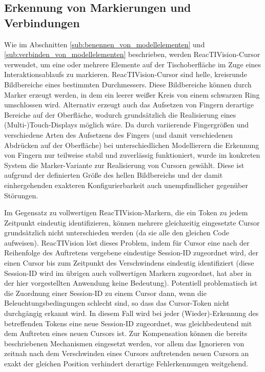 
\subsection{Erkennung von Markierungen und Verbindungen} %
\label{sub:erkennen_von_verbindungen}

Wie im Abschnitten \ref{sub:benennen_von_modellelementen} und \ref{sub:verbinden_von_modellelementen} beschrieben, werden ReacTIVision-Cursor verwendet, um eine oder mehrere Elemente auf der Tischoberfläche im Zuge eines Interaktionsablaufs zu markieren. ReacTIVision-Cursor sind helle, kreisrunde Bildbereiche eines bestimmten Durchmessers. Diese Bildbereiche können durch Marker erzeugt werden, in dem ein leerer weißer Kreis von einem schwarzen Ring umschlossen wird. Alternativ erzeugt auch das Aufsetzen von Fingern derartige Bereiche auf der Oberfläche, wodurch grundsätzlich die Realisierung eines (Multi-)Touch-Displays möglich wäre. Da durch variierende Fingergrößen und verschiedene Arten des Aufsetzens des Fingers (und damit verschiedenen Abdrücken auf der Oberfläche) bei unterschiedlichen Modellierern die Erkennung von Fingern nur teilweise stabil und zuverlässig funktioniert, wurde im konkreten System die Marker-Variante zur Realisierung von Cursorn gewählt. Diese ist aufgrund der definierten Größe des hellen Bildbereichs und der damit einhergehenden exakteren Konfigurierbarkeit auch unempfindlicher gegenüber Störungen.

Im Gegensatz zu vollwertigen ReacTIVision-Markern, die ein Token zu jedem Zeitpunkt eindeutig identifizieren, können mehrere gleichzeitig eingesetzte Cursor grundsätzlich nicht unterschieden werden (da sie alle den gleichen Code aufweisen). ReacTIVision löst dieses Problem, indem für Cursor eine nach der Reihenfolge des Auftretens vergebene eindeutige Session-ID zugeordnet wird, der einen Cursor bis zum Zeitpunkt des Verschwindens eindeutig identifiziert (diese Session-ID wird im übrigen auch vollwertigen Markern zugeordnet, hat aber in der hier vorgestellten Anwendung keine Bedeutung). Potentiell problematisch ist die Zuordnung einer Session-ID zu einem Cursor dann, wenn die Beleuchtungsbedingungen schlecht sind, so dass das Cursor-Token nicht durchgängig erkannt wird. In diesem Fall wird bei jeder (Wieder)-Erkennung des betreffenden Tokens eine neue Session-ID zugeordnet, was gleichbedeutend mit dem Auftreten eines neuen Cursors ist. Zur Kompensation können die bereits beschriebenen Mechanismen eingesetzt werden, vor allem das Ignorieren von zeitnah nach dem Verschwinden eines Cursors auftretenden neuen Cursorn an exakt der gleichen Position verhindert derartige Fehlerkennungen weitgehend.

